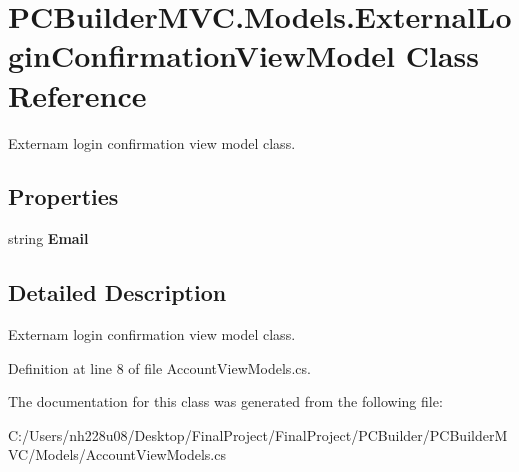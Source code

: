 \hypertarget{class_p_c_builder_m_v_c_1_1_models_1_1_external_login_confirmation_view_model}{}\section{P\+C\+Builder\+M\+V\+C.\+Models.\+External\+Login\+Confirmation\+View\+Model Class Reference}
\label{class_p_c_builder_m_v_c_1_1_models_1_1_external_login_confirmation_view_model}


Externam login confirmation view model class.  


\subsection*{Properties}
\begin{DoxyCompactItemize}
\item 
string {\bfseries Email}\hypertarget{class_p_c_builder_m_v_c_1_1_models_1_1_external_login_confirmation_view_model_af8009228d4a54939027c2a6a983b5050}{}\label{class_p_c_builder_m_v_c_1_1_models_1_1_external_login_confirmation_view_model_af8009228d4a54939027c2a6a983b5050}

\end{DoxyCompactItemize}


\subsection{Detailed Description}
Externam login confirmation view model class. 



Definition at line 8 of file Account\+View\+Models.\+cs.



The documentation for this class was generated from the following file\+:\begin{DoxyCompactItemize}
\item 
C\+:/\+Users/nh228u08/\+Desktop/\+Final\+Project/\+Final\+Project/\+P\+C\+Builder/\+P\+C\+Builder\+M\+V\+C/\+Models/Account\+View\+Models.\+cs\end{DoxyCompactItemize}
